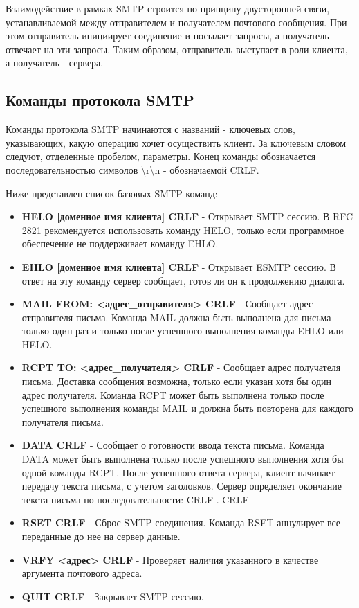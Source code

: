 \documentclass[a4paper,12pt]{report}
\begin{document}
Взаимодействие в рамках SMTP строится по принципу двусторонней связи, устанавливаемой   между отправителем и получателем почтового сообщения. При этом отправитель инициирует соединение и посылает запросы, а получатель - отвечает на эти запросы. Таким образом, отправитель выступает в роли клиента, а получатель - сервера.

\subsection{Команды протокола SMTP}

Команды протокола SMTP начинаются с названий - ключевых слов, указывающих, какую операцию хочет осуществить клиент.
За ключевым словом следуют, отделенные пробелом, параметры. Конец команды обозначается последовательностью символов \textbackslash r\textbackslash n - обозначаемой CRLF. 

Ниже представлен список базовых SMTP-команд:
\begin{itemize}
	\item \textbf{HELO [доменное имя клиента] CRLF} - Открывает SMTP сессию. В RFC 2821 рекомендуется использовать команду HELO, только если программное обеспечение не поддерживает команду EHLO.
	\item \textbf{EHLO [доменное имя клиента] CRLF} - Открывает ESMTP сессию. В ответ на эту команду сервер сообщает, готов ли он к продолжению диалога.
	\item \textbf{MAIL FROM: <адрес\_отправителя> CRLF} - Сообщает адрес отправителя письма. Команда MAIL должна быть выполнена для письма только один раз и только после успешного выполнения команды EHLO или HELO.
	\item \textbf{RCPT TO: <адрес\_получателя> CRLF} - Сообщает адрес получателя письма. Доставка сообщения возможна, только если указан хотя бы один адрес получателя. Команда RCPT может быть выполнена только после успешного выполнения команды MAIL и должна быть повторена для каждого получателя письма.
	\item \textbf{DATA CRLF} - Сообщает о готовности ввода текста письма. Команда DATA может быть выполнена только после успешного выполнения хотя бы одной команды RCPT. После успешного ответа сервера, клиент начинает передачу текста письма, с учетом заголовков. Сервер определяет окончание текста письма по последовательности: CRLF . CRLF
	\item \textbf{RSET CRLF} - Сброс SMTP соединения. Команда RSET аннулирует все переданные до нее на сервер данные.
	\item \textbf{VRFY <адрес> CRLF} - Проверяет наличия указанного в качестве аргумента почтового адреса.
	\item \textbf{QUIT CRLF} - Закрывает SMTP сессию.
\end{itemize}
\end{document}
